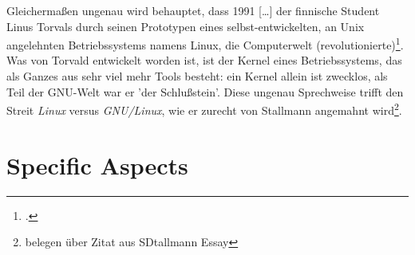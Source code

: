 \documentclass[DIV=calc,BCOR=5mm,11pt,headings=small,oneside,abstract=true, toc=bib]{scrartcl}
\begin{document}
Gleichermaßen ungenau wird behauptet, dass \glqq{}1991 [\ldots] der
finnische Student Linus Torvals durch seinen Prototypen eines
selbst-entwickelten, an Unix angelehnten Betriebssystems namens Linux,
die Computerwelt (revolutionierte)\grqq{}\footcite[13][]{SeeKra2008a}. Was von
Torvald entwickelt worden ist, ist der Kernel eines Betriebssystems, das als
Ganzes aus sehr viel mehr Tools besteht: ein Kernel allein ist zwecklos, als
Teil der GNU-Welt war er 'der Schlußstein'. Diese ungenau Sprechweise trifft den
Streit \textit{Linux} versus \textit{GNU/Linux}, wie er zurecht von Stallmann angemahnt
wird\footnote{belegen über Zitat aus SDtallmann Essay}.
\section{Specific Aspects}

\small

\end{document}
